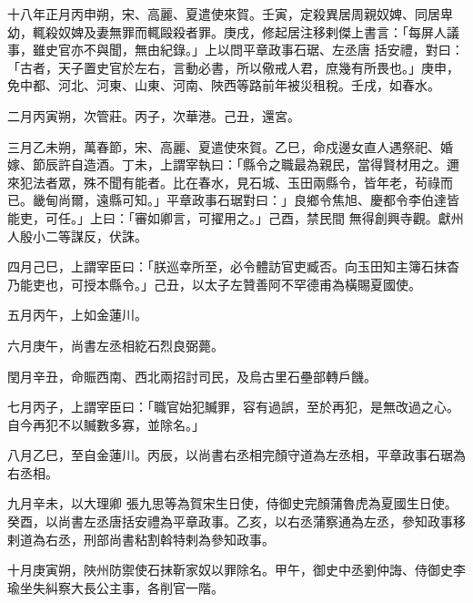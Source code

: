 \begin{pinyinscope}
 十八年正月丙申朔，宋、高麗、夏遣使來賀。壬寅，定殺異居周親奴婢、同居卑幼，輒殺奴婢及妻無罪而輒毆殺者罪。庚戌，修起居注移剌傑上書言：「每屏人議事，雖史官亦不與聞，無由紀錄。」上以問平章政事石琚、左丞唐
 括安禮，對曰：「古者，天子置史官於左右，言動必書，所以儆戒人君，庶幾有所畏也。」庚申，免中都、河北、河東、山東、河南、陜西等路前年被災租稅。壬戌，如春水。



 二月丙寅朔，次管莊。丙子，次華港。己丑，還宮。



 三月乙未朔，萬春節，宋、高麗、夏遣使來賀。乙巳，命戍邊女直人遇祭祀、婚嫁、節辰許自造酒。丁未，上謂宰執曰：「縣令之職最為親民，當得賢材用之。邇來犯法者眾，殊不聞有能者。比在春水，見石城、玉田兩縣令，皆年老，茍祿而已。畿甸尚爾，遠縣可知。」平章政事石琚對曰：」良鄉令焦旭、慶都令李伯達皆能吏，可任。」上曰：「審如卿言，可擢用之。」己酉，禁民間
 無得創興寺觀。獻州人殷小二等謀反，伏誅。



 四月己巳，上謂宰臣曰：「朕巡幸所至，必令體訪官吏臧否。向玉田知主簿石抹杳乃能吏也，可授本縣令。」己丑，以太子左贊善阿不罕德甫為橫賜夏國使。



 五月丙午，上如金蓮川。



 六月庚午，尚書左丞相紇石烈良弼薨。



 閏月辛丑，命賑西南、西北兩招討司民，及烏古里石壘部轉戶饑。



 七月丙子，上謂宰臣曰：「職官始犯贓罪，容有過誤，至於再犯，是無改過之心。自今再犯不以贓數多寡，並除名。」



 八月乙巳，至自金蓮川。丙辰，以尚書右丞相完顏守道為左丞相，平章政事石琚為右丞相。



 九月辛未，以大理卿
 張九思等為賀宋生日使，侍御史完顏蒲魯虎為夏國生日使。癸酉，以尚書左丞唐括安禮為平章政事。乙亥，以右丞蒲察通為左丞，參知政事移剌道為右丞，刑部尚書粘割斡特剌為參知政事。



 十月庚寅朔，陜州防禦使石抹靳家奴以罪除名。甲午，御史中丞劉仲誨、侍御史李瑜坐失糾察大長公主事，各削官一階。




\end{pinyinscope}
